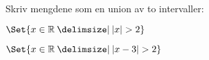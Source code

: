 \documentclass[a4paper,11pt]{article}
\begin{document}

\begin{problem}[17]
  Skriv mengdene som en union av to intervaller:
  \begin{multicols}{2}
    \begin{subproblem}
      \label{subproblem:1-mix-17a-MAT-0001-2019-V}
      $\Set{x \in \R \given \abs{x} > 2}$
    \end{subproblem}
    \begin{subproblem}
      \label{subproblem:1-mix-17b-MAT-0001-2019-V}
      $\Set{x \in \R \given \abs{x - 3} > 2}$
    \end{subproblem}
  \end{multicols}
\end{problem}
\end{document}
